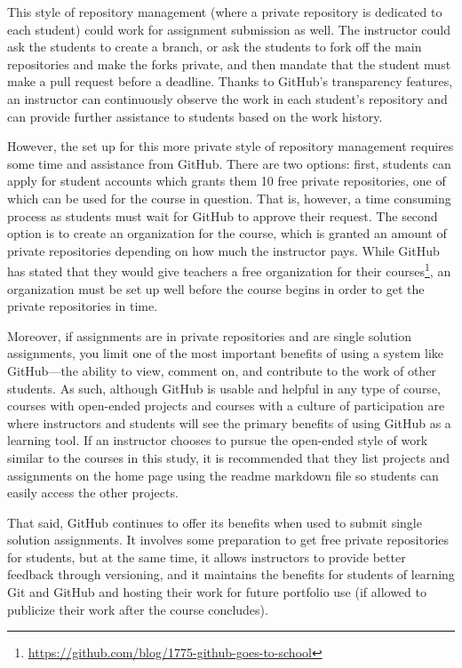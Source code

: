 This style of repository management (where a private repository is dedicated to each student) could work for assignment submission as well. The instructor could ask the students to create a branch, or ask the students to fork off the main repositories and make the forks private, and then mandate that the student must make a pull request before a deadline. Thanks to GitHub's transparency features, an instructor can continuously observe the work in each student's repository and can provide further assistance to students based on the work history.

However, the set up for this more private style of repository management requires some time and assistance from GitHub. There are two options: first, students can apply for student accounts which grants them 10 free private repositories, one of which can be used for the course in question. That is, however, a time consuming process as students must wait for GitHub to approve their request. The second option is to create an organization for the course, which is granted an amount of private repositories depending on how much the instructor pays. While GitHub has stated that they would give teachers a free organization for their courses\footnote{\url{https://github.com/blog/1775-github-goes-to-school}}, an organization must be set up well before the course begins in order to get the private repositories in time.

Moreover, if assignments are in private repositories and are single solution assignments, you limit one of the most important benefits of using a system like GitHub---the ability to view, comment on, and contribute to the work of other students. As such, although GitHub is usable and helpful in any type of course, courses with open-ended projects and courses with a culture of participation are where instructors and students will see the primary benefits of using GitHub as a learning tool. If an instructor chooses to pursue the open-ended style of work similar to the courses in this study, it is recommended that they list projects and assignments on the home page using the readme markdown file so students can easily access the other projects.

That said, GitHub continues to offer its benefits when used to submit single solution assignments. It involves some preparation to get free private repositories for students, but at the same time, it allows instructors to provide better feedback through versioning, and it maintains the benefits for students of learning Git and GitHub and hosting their work for future portfolio use (if allowed to publicize their work after the course concludes). \\

